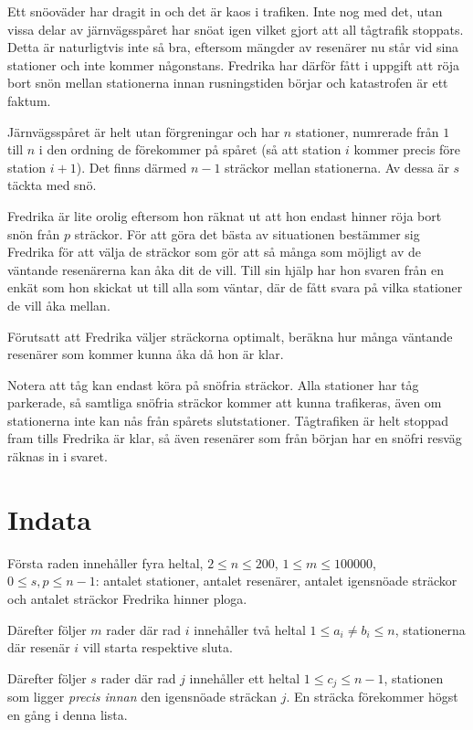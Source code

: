 Ett snöoväder har dragit in och det är kaos i trafiken.
Inte nog med det, utan vissa delar av järnvägsspåret har snöat igen vilket gjort att all tågtrafik stoppats.
Detta är naturligtvis inte så bra, eftersom mängder av resenärer nu står vid sina stationer och inte kommer någonstans.
Fredrika har därför fått i uppgift att röja bort snön mellan stationerna innan rusningstiden börjar och katastrofen är ett faktum.

Järnvägsspåret är helt utan förgreningar och har $n$ stationer, numrerade från $1$ till $n$ i den ordning de förekommer på spåret (så att station $i$ kommer precis före station $i+1$).
Det finns därmed $n - 1$ sträckor mellan stationerna.
Av dessa är $s$ täckta med snö.

Fredrika är lite orolig eftersom hon räknat ut att hon endast hinner röja bort snön från $p$ sträckor.
För att göra det bästa av situationen bestämmer sig Fredrika för att välja de sträckor som gör att så många som möjligt av de väntande resenärerna kan åka dit de vill.
Till sin hjälp har hon svaren från en enkät som hon skickat ut till alla som väntar, där de fått svara på vilka stationer de vill åka mellan.

Förutsatt att Fredrika väljer sträckorna optimalt, beräkna hur många väntande resenärer som kommer kunna åka då hon är klar.

Notera att tåg kan endast köra på snöfria sträckor. Alla stationer har tåg parkerade, så samtliga snöfria sträckor kommer att kunna trafikeras, även om stationerna inte kan nås från spårets slutstationer. Tågtrafiken är helt stoppad fram tills Fredrika är klar, så även resenärer som från början har en snöfri resväg räknas in i svaret.

\section*{Indata}
Första raden innehåller fyra heltal, $2 \le n \le 200$, $ 1 \le m \le 100000 $, $ 0 \le s, p \le n - 1$: antalet stationer, antalet resenärer, antalet igensnöade sträckor och antalet sträckor Fredrika hinner ploga.

Därefter följer $m$ rader där rad $i$ innehåller två heltal $1 \le a_i \not= b_i \le n$, stationerna där resenär $i$ vill starta respektive sluta.

Därefter följer $s$ rader där rad $j$ innehåller ett heltal $ 1 \le c_j \le n - 1$, stationen som ligger \emph{precis innan} den igensnöade sträckan $j$.
En sträcka förekommer högst en gång i denna lista.


